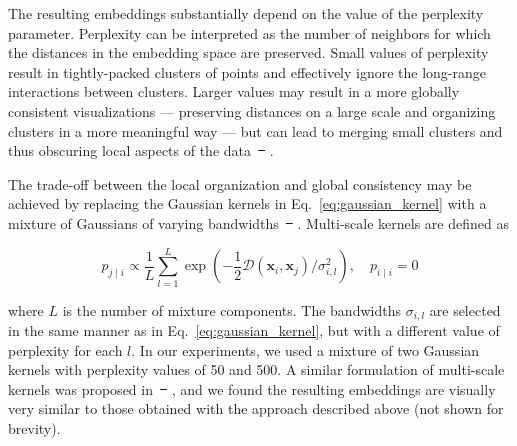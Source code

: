 \documentclass[runningheads]{llncs}
\providecommand{\DIFaddtex}[1]{{\protect\color{blue}\uwave{#1}}} %
\providecommand{\DIFdeltex}[1]{{\protect\color{red}\sout{#1}}}                      %
\providecommand{\DIFaddbegin}{} %
\providecommand{\DIFaddend}{} %
\providecommand{\DIFdelbegin}{} %
\providecommand{\DIFdelend}{} %
\providecommand{\DIFadd}[1]{\texorpdfstring{\DIFaddtex{#1}}{#1}} %
\providecommand{\DIFdel}[1]{\texorpdfstring{\DIFdeltex{#1}}{}} %
\newcommand{\DIFscaledelfig}{0.5}
\newlength{\DIFdelgraphicswidth} %
\newlength{\DIFdelgraphicsheight} %
\newcommand{\DIFaddincludegraphics}[2][]{{\color{blue}\fbox{\DIFOincludegraphics[#1]{#2}}}} %
\newcommand{\DIFdelincludegraphics}[2][]{%
\sbox{\DIFdelgraphicsbox}{\DIFOincludegraphics[#1]{#2}}%
\settoboxwidth{\DIFdelgraphicswidth}{\DIFdelgraphicsbox} %
\settoboxtotalheight{\DIFdelgraphicsheight}{\DIFdelgraphicsbox} %
\scalebox{\DIFscaledelfig}{%
\parbox[b]{\DIFdelgraphicswidth}{\usebox{\DIFdelgraphicsbox}\\[-\baselineskip] \rule{\DIFdelgraphicswidth}{0em}}\llap{\resizebox{\DIFdelgraphicswidth}{\DIFdelgraphicsheight}{%
\setlength{\unitlength}{\DIFdelgraphicswidth}%
\begin{picture}(1,1)%
\thicklines\linethickness{2pt} %
{\color[rgb]{1,0,0}\put(0,0){\framebox(1,1){}}}%
{\color[rgb]{1,0,0}\put(0,0){\line( 1,1){1}}}%
{\color[rgb]{1,0,0}\put(0,1){\line(1,-1){1}}}%
\end{picture}%
}\hspace*{3pt}}} %
} %
\DeclareRobustCommand{\DIFaddbegin}{\DIFOaddbegin \let\includegraphics\DIFaddincludegraphics} %
\DeclareRobustCommand{\DIFaddend}{\DIFOaddend \let\includegraphics\DIFOincludegraphics} %
\DeclareRobustCommand{\DIFdelbegin}{\DIFOdelbegin \let\includegraphics\DIFdelincludegraphics} %
\DeclareRobustCommand{\DIFdelend}{\DIFOaddend \let\includegraphics\DIFOincludegraphics} %
\begin{document}
The resulting embeddings substantially depend on the value of the perplexity
parameter. Perplexity can be interpreted as the number of neighbors for which
the distances in the embedding space are preserved. Small values of perplexity
result in tightly-packed clusters of points and effectively ignore the
long-range interactions between clusters. Larger values may result in a more
globally consistent visualizations --- preserving distances on a large scale and
organizing clusters in a more meaningful way --- but can lead to merging small
clusters and thus obscuring local aspects of the data~\DIFdelbegin \DIFdel{\mbox{%
\cite{art_of_using_tsne}}\hspace{0pt}%
}\DIFdelend \DIFaddbegin \DIFadd{\mbox{%
\cite{Kobak2019}}\hspace{0pt}%
}\DIFaddend .

The trade-off between the local organization and global consistency may be
achieved by replacing the Gaussian kernels in Eq.~\ref{eq:gaussian_kernel} with
a mixture of Gaussians of varying bandwidths~\DIFdelbegin \DIFdel{\mbox{%
\cite{multiscale_tsne}}\hspace{0pt}%
}\DIFdelend \DIFaddbegin \DIFadd{\mbox{%
\cite{Lee2015}}\hspace{0pt}%
}\DIFaddend . Multi-scale kernels
are defined as

\begin{equation}
p_{j \mid i} \propto \frac{1}{L} \sum_{l=1}^{L} \exp \left ( - \frac{1}{2} \mathcal{D}(\mathbf{x}_i, \mathbf{x}_j ) / \sigma_{i,l}^2 \right ), \quad p_{i \mid i} = 0
\label{eq:multiscale}
\end{equation}

\noindent where $L$ is the number of mixture components. The bandwidths
$\sigma_{i,l}$ are selected in the same manner as in
Eq.~\ref{eq:gaussian_kernel}, but with a different value of perplexity for each
$l$. In our experiments, we used a mixture of two Gaussian kernels with
perplexity values of 50 and 500. A similar formulation of multi-scale kernels
was proposed in~\DIFdelbegin \DIFdel{\mbox{%
\cite{art_of_using_tsne}}\hspace{0pt}%
}\DIFdelend \DIFaddbegin \DIFadd{\mbox{%
\cite{Kobak2019}}\hspace{0pt}%
}\DIFaddend , and we found the resulting embeddings are
visually very similar to those obtained with the approach described above (not
shown for brevity).
\end{document}
